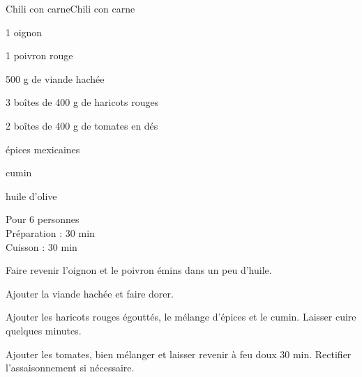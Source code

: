 \begin{recette}{Chili con carne}{Chili con carne}

\begin{ingredients}
1 oignon\par
1 poivron rouge\par
500 g de viande hachée\par
3 boîtes de 400 g de haricots rouges\par
2 boîtes de 400 g de tomates en dés\par
épices mexicaines\par
cumin\par
huile d'olive\par
\end{ingredients}

\begin{infos}
Pour 6 personnes\\
Préparation : 30 min\\
Cuisson : 30 min\\
\end{infos}

\begin{etapes}
\item Faire revenir l'oignon et le poivron émins dans un peu d'huile.
\item Ajouter la viande hachée et faire dorer.
\item Ajouter les haricots rouges égouttés, le mélange d'épices et le cumin. Laisser cuire quelques minutes.
\item Ajouter les tomates, bien mélanger et laisser revenir à feu doux 30 min. Rectifier l'assaisonnement si nécessaire.
\end{etapes}

\end{recette}